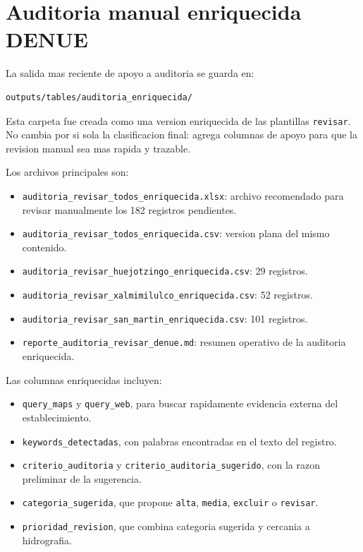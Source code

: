 \documentclass[11pt,letterpaper]{article}
\begin{document}
\section{Auditoria manual enriquecida DENUE}

La salida mas reciente de apoyo a auditoria se guarda en:

\begin{verbatim}
outputs/tables/auditoria_enriquecida/
\end{verbatim}

Esta carpeta fue creada como una version enriquecida de las plantillas \texttt{revisar}. No cambia por si sola la clasificacion final: agrega columnas de apoyo para que la revision manual sea mas rapida y trazable.

Los archivos principales son:

\begin{itemize}
  \item \texttt{auditoria\_revisar\_todos\_enriquecida.xlsx}: archivo recomendado para revisar manualmente los 182 registros pendientes.
  \item \texttt{auditoria\_revisar\_todos\_enriquecida.csv}: version plana del mismo contenido.
  \item \texttt{auditoria\_revisar\_huejotzingo\_enriquecida.csv}: 29 registros.
  \item \texttt{auditoria\_revisar\_xalmimilulco\_enriquecida.csv}: 52 registros.
  \item \texttt{auditoria\_revisar\_san\_martin\_enriquecida.csv}: 101 registros.
  \item \texttt{reporte\_auditoria\_revisar\_denue.md}: resumen operativo de la auditoria enriquecida.
\end{itemize}

Las columnas enriquecidas incluyen:

\begin{itemize}
  \item \texttt{query\_maps} y \texttt{query\_web}, para buscar rapidamente evidencia externa del establecimiento.
  \item \texttt{keywords\_detectadas}, con palabras encontradas en el texto del registro.
  \item \texttt{criterio\_auditoria} y \texttt{criterio\_auditoria\_sugerido}, con la razon preliminar de la sugerencia.
  \item \texttt{categoria\_sugerida}, que propone \texttt{alta}, \texttt{media}, \texttt{excluir} o \texttt{revisar}.
  \item \texttt{prioridad\_revision}, que combina categoria sugerida y cercania a hidrografia.
\end{itemize}
\end{document}
